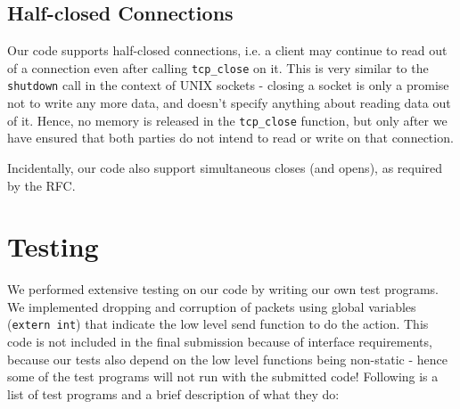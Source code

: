 \documentclass{article}
\begin{document}
\subsection{Half-closed Connections}
Our code supports half-closed connections, i.e. a client may continue to read out of a connection even after calling \texttt{tcp\_close} on it. This is very similar to the \texttt{shutdown} call in the context of UNIX sockets - closing a socket is only a promise not to write any more data, and doesn't specify anything about reading data out of it. Hence, no memory is released in the \texttt{tcp\_close} function, but only after we have ensured that both parties do not intend to read or write on that connection.

Incidentally, our code also support simultaneous closes (and opens), as required by the RFC.

\section{Testing}
We performed extensive testing on our code by writing our own test programs. We implemented dropping and corruption of packets using global variables (\texttt{extern int}) that indicate the low level send function to do the action. This code is not included in the final submission because of interface requirements, because our tests also depend on the low level functions being non-static - hence some of the test programs will not run with the submitted code! Following is a list of test programs and a brief description of what they do:
\end{document}
